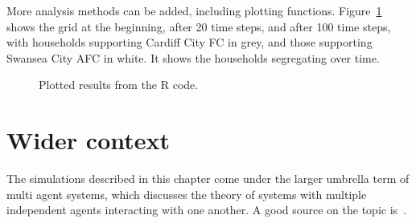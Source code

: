 More analysis methods can be added, including plotting functions.
Figure~\ref{fig:schelling_R_plot} shows the grid at the beginning, after 20
time steps, and after 100 time steps, with households supporting Cardiff City FC
in grey, and those supporting Swansea City AFC in white.
It shows the households segregating over time.

\begin{figure}
\begin{center}
\end{center}
\caption{Plotted results from the R code.}
\label{fig:schelling_R_plot}
\end{figure}

\section{Wider context}\label{sec:agent_based_simulation_wider_context}

The simulations described in this chapter come under the larger umbrella term of
multi agent systems, which discusses the theory of systems with multiple
independent agents interacting with one another. A good source on the topic
is~\cite{shoham2008multiagent}.

